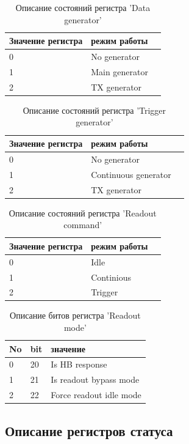 \documentclass{article}
\begin{document}
\begin{table}[H]
\centering
\begin{tabular}{| l | l | l |}
\hline
Значение регистра & режим работы \\ \hline
0 & No generator \\ \hline
1 & Main generator \\ \hline
2 & TX generator \\ \hline
\end{tabular}
\caption{Описание состояний регистра 'Data generator'\label{tab4}}
\end{table}


\begin{table}[H]
\centering
\begin{tabular}{| l | l | l |}
\hline
Значение регистра & режим работы \\ \hline
0 & No generator \\ \hline
1 & Continuous generator \\ \hline
2 & TX generator \\ \hline
\end{tabular}
\caption{Описание состояний регистра 'Trigger generator'\label{tab5}}
\end{table}


\begin{table}[H]
\centering
\begin{tabular}{| l | l | l |}
\hline
Значение регистра & режим работы \\ \hline
0 & Idle \\ \hline
1 & Continious \\ \hline
2 & Trigger \\ \hline
\end{tabular}
\caption{Описание состояний регистра 'Readout command'\label{tab6}}
\end{table}


\begin{table}[H]
\centering
\begin{tabular}{| l | l | l |}
\hline
No & bit & значение \\ \hline
0 & 20 & Is HB response \\ \hline
1 & 21 & Is readout bypass mode \\ \hline
2 & 22 & Force readout idle mode \\ \hline
\end{tabular}
\caption{Описание битов регистра 'Readout mode'\label{tab7}}
\end{table}


\subsection{Описание регистров статуса}
\end{document}

